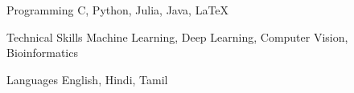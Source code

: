 

\begin{cvskills}

  \cvskill
    {Programming} %
    {C, Python, Julia, Java, LaTeX} %

  \cvskill
    {Technical Skills} %
    {Machine Learning, Deep Learning, Computer Vision, Bioinformatics} %

  \cvskill
    {Languages} %
    {English, Hindi, Tamil} %

\end{cvskills}
